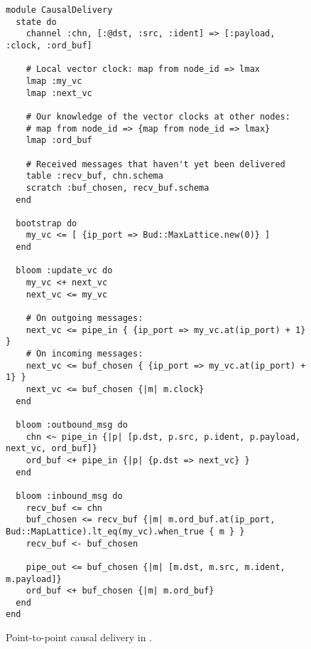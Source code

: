 \begin{figure}[t]
\begin{scriptsize}
\begin{lstlisting}
module CausalDelivery
  state do
    channel :chn, [:@dst, :src, :ident] => [:payload, :clock, :ord_buf]

    # Local vector clock: map from node_id => lmax
    lmap :my_vc
    lmap :next_vc

    # Our knowledge of the vector clocks at other nodes:
    # map from node_id => {map from node_id => lmax}
    lmap :ord_buf

    # Received messages that haven't yet been delivered
    table :recv_buf, chn.schema
    scratch :buf_chosen, recv_buf.schema
  end

  bootstrap do
    my_vc <= [ {ip_port => Bud::MaxLattice.new(0)} ]
  end

  bloom :update_vc do
    my_vc <+ next_vc
    next_vc <= my_vc

    # On outgoing messages:
    next_vc <= pipe_in { {ip_port => my_vc.at(ip_port) + 1} }
    # On incoming messages:
    next_vc <= buf_chosen { {ip_port => my_vc.at(ip_port) + 1} }
    next_vc <= buf_chosen {|m| m.clock}
  end

  bloom :outbound_msg do
    chn <~ pipe_in {|p| [p.dst, p.src, p.ident, p.payload, next_vc, ord_buf]}
    ord_buf <+ pipe_in {|p| {p.dst => next_vc} }
  end

  bloom :inbound_msg do
    recv_buf <= chn
    buf_chosen <= recv_buf {|m| m.ord_buf.at(ip_port, Bud::MapLattice).lt_eq(my_vc).when_true { m } }
    recv_buf <- buf_chosen

    pipe_out <= buf_chosen {|m| [m.dst, m.src, m.ident, m.payload]}
    ord_buf <+ buf_chosen {|m| m.ord_buf}
  end
end
\end{lstlisting}
\end{scriptsize}
\caption{Point-to-point causal delivery in \lang.}
\label{fig:causal-delivery-src}
\end{figure}
